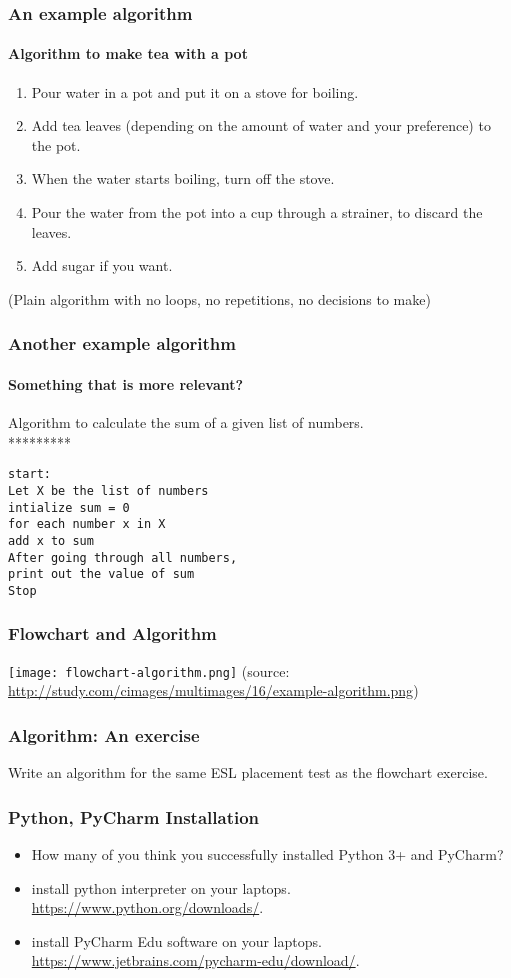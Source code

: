 \documentclass{beamer}
\begin{document}
\begin{frame}%
\frametitle{An example algorithm}
\framesubtitle{Algorithm to make tea with a pot}
\begin{enumerate}
\item Pour water in a pot and put it on a stove for boiling.
\item Add tea leaves (depending on the amount of water and your preference) to the pot.
\item When the water starts boiling, turn off the stove.
\item Pour the water from the pot into a cup through a strainer, to discard the leaves.
\item Add sugar if you want.
\end{enumerate}

(Plain algorithm with no loops, no repetitions, no decisions to make)
\end{frame}

\begin{frame}[fragile]%
\frametitle{Another example algorithm}
\framesubtitle{Something that is more relevant?}
Algorithm to calculate the sum of a given list of numbers. \\
*********
\begin{verbatim}
start: 
Let X be the list of numbers
intialize sum = 0
for each number x in X
add x to sum
After going through all numbers, 
print out the value of sum
Stop
\end{verbatim}
\end{frame}

\begin{frame}
\frametitle{Flowchart and Algorithm}
\texttt{[image: flowchart-algorithm.png]}
\medskip (source: \url{http://study.com/cimages/multimages/16/example-algorithm.png})
\end{frame}

\begin{frame}%
\frametitle{Algorithm: An exercise}
Write an algorithm for the same ESL placement test as the flowchart exercise.
\end{frame}


\begin{frame}%
\frametitle{Python, PyCharm Installation}
\begin{itemize}
\item How many of you think you successfully installed Python 3+ and PyCharm?
\item install python interpreter on your laptops. \url{https://www.python.org/downloads/}. 
\item install PyCharm Edu software on your laptops. \url{https://www.jetbrains.com/pycharm-edu/download/}. 
\end{itemize}
\end{frame}
\end{document}

